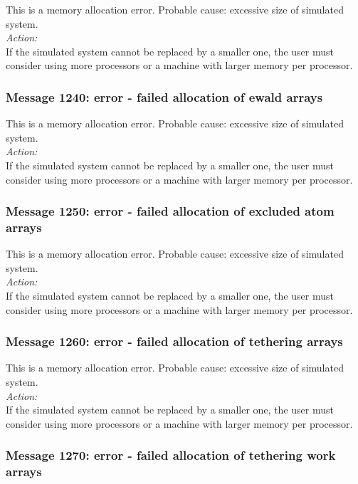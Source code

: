 This is a memory allocation error. Probable cause: excessive size of
simulated system. \\

\noindent
{\em Action:}\\
If the simulated system cannot be replaced by a smaller one, the user
must consider using more processors or a machine with larger memory
per processor.

\subsubsection*{Message 1240: error - failed allocation of ewald
arrays}

This is a memory allocation error. Probable cause: excessive size of
simulated system. \\

\noindent
{\em Action:}\\
If the simulated system cannot be replaced by a smaller one, the user
must consider using more processors or a machine with larger memory
per processor.

\subsubsection*{Message 1250: error - failed allocation of excluded
atom arrays}

This is a memory allocation error. Probable cause: excessive size of
simulated system. \\

\noindent
{\em Action:}\\
If the simulated system cannot be replaced by a smaller one, the user
must consider using more processors or a machine with larger memory
per processor.

\subsubsection*{Message 1260: error - failed allocation of tethering
arrays}

This is a memory allocation error. Probable cause: excessive size of
simulated system. \\

\noindent
{\em Action:}\\
If the simulated system cannot be replaced by a smaller one, the user
must consider using more processors or a machine with larger memory
per processor.

\subsubsection*{Message 1270: error - failed allocation of tethering
work arrays}

